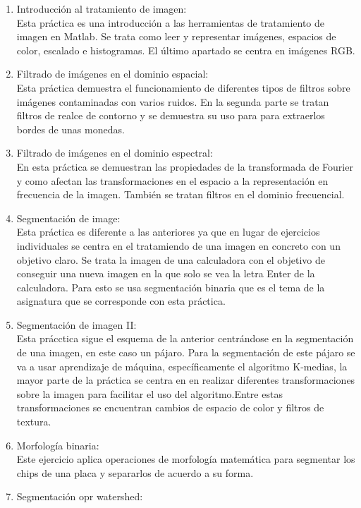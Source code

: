 \documentclass[a4paper,12pt]{report}
\begin{document}
\begin{enumerate}
  \item Introducción al tratamiento de imagen:\\
	Esta práctica es una introducción a las herramientas de tratamiento de imagen en Matlab. Se trata como leer y representar imágenes, espacios de color, escalado e histogramas. El último apartado se centra en imágenes RGB.
  \item Filtrado de imágenes en el dominio espacial:\\
	Esta práctica demuestra el funcionamiento de diferentes tipos de filtros sobre imágenes contaminadas con varios ruidos. En la segunda parte se tratan filtros de realce de contorno y se demuestra su uso para para extraerlos bordes de unas monedas.
  \item Filtrado de imágenes en el dominio espectral:\\
	En esta práctica se demuestran las propiedades de la transformada de Fourier y como afectan las transformaciones en el espacio a la representación en frecuencia de la imagen. También se tratan filtros en el dominio frecuencial.
  \item Segmentación de image:\\
	Esta práctica es diferente a las anteriores ya que en lugar de ejercicios individuales se centra en el tratamiendo de una imagen en concreto con un objetivo claro. Se trata  la imagen de una calculadora con el objetivo de conseguir una nueva imagen en la que solo se vea la letra Enter de la calculadora. Para esto se usa segmentación binaria que es el tema de la asignatura que se corresponde con esta práctica.
  \item Segmentación de imagen II:\\
	Esta prácctica sigue el esquema de la anterior centrándose en la segmentación de una imagen, en este caso un pájaro. Para la segmentación de este pájaro se va a usar aprendizaje de máquina, específicamente el algoritmo K-medias, la mayor parte de la práctica se centra en en realizar diferentes transformaciones sobre la imagen para facilitar el uso del algoritmo.Entre estas transformaciones se encuentran cambios de espacio de color y filtros de textura.
  \item Morfología binaria:\\
	Este ejercicio aplica operaciones de morfología matemática para segmentar los chips de una placa y separarlos de acuerdo a su forma.
  \item Segmentación opr watershed:\\

\end{enumerate}
\end{document}
